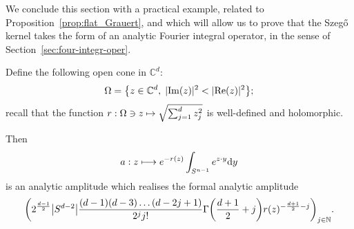 \documentclass[10pt]{amsart}
\theoremstyle{definition}\newtheorem{defi}[theo]{Definition}\newtheorem{rema}[theo]{Remark}\newtheorem{exam}[theo]{Example}\newtheorem{exem}[theo]{Example}\newtheorem{nota}[theo]{Notation}
\DeclareMathOperator{\re}{Re}
\DeclareMathOperator{\im}{Im}
\newcommand\1{\mathds{1}}
\newcommand{\C}{\mathbb{C}}
\newcommand{\N}{\mathbb{N}}
\newcommand{\dd}{\mathrm{d}}
\let\oldmapsto\mapsto
\renewcommand*{\mapsto}{\mathchoice{\longmapsto}{\oldmapsto}{\oldmapsto}{\oldmapsto}}
\let\originalleft\left
\let\originalright\right
\renewcommand{\left}{\mathopen{}\mathclose\bgroup\originalleft}
\renewcommand{\right}{\aftergroup\egroup\originalright}
\begin{document}
We conclude this section with a practical example, related to Proposition~\ref{prop:flat_Grauert}, and which will allow us to prove that the Szeg\H{o} kernel takes the form of an analytic Fourier integral operator, in the sense of Section~\ref{sec:four-integr-oper}.

\begin{prop}\label{prop:m_n_amplitude}
Define the following open cone in $\C^d$:
\[
\Omega=\left\{z\in \C^d,\; \lvert\im(z)|^2<\lvert\re(z)|^2\right \};
\]
recall that the function $r:\Omega\ni z\mapsto
\sqrt{\sum_{j=1}^dz_j^2}$ is well-defined and holomorphic.

Then
\[
a:z\mapsto e^{-r(z)}\int_{S^{n-1}}e^{z\cdot y}\dd y
\]
is an analytic amplitude which realises the formal analytic amplitude
\[
\left(2^{\frac{d-1}{2}}\left|S^{d-2}\right|\frac{(d-1)(d-3)\dots (d-2j+1)}{2^jj!}\Gamma\left(\frac{d+1}{2}+j\right)r(z)^{-\frac{d+1}{2}-j}\right)_{j\in \N}.
\]
\end{prop}
\end{document}
